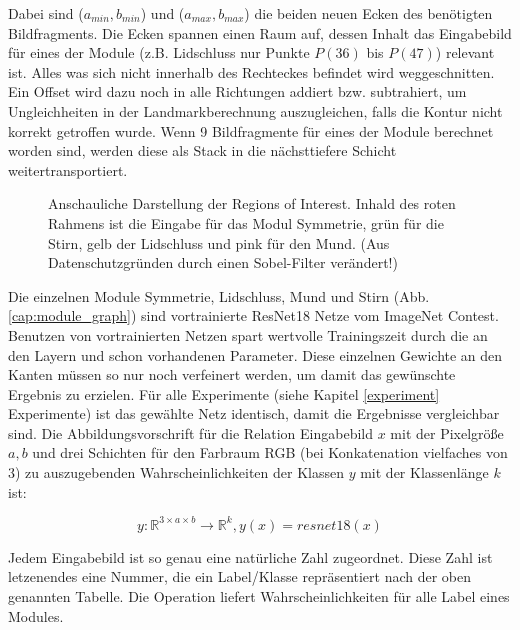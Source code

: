 Dabei sind ($a_{min}, b_{min}$) und ($a_{max}, b_{max}$) die beiden neuen Ecken des benötigten Bildfragments. Die Ecken spannen einen Raum auf, dessen Inhalt das Eingabebild für eines der Module (z.B. Lidschluss nur Punkte $P(36)$ bis $P(47)$) relevant ist. Alles was sich nicht innerhalb des Rechteckes befindet wird weggeschnitten. Ein Offset wird dazu noch in alle Richtungen addiert bzw. subtrahiert, um Ungleichheiten in der Landmarkberechnung auszugleichen, falls die Kontur nicht korrekt getroffen wurde. Wenn 9 Bildfragmente für eines der Module berechnet worden sind, werden diese als Stack in die nächsttiefere Schicht weitertransportiert.


\begin{figure}[!t]\centering
\makebox[0pt]{}
\vspace{-1cm}
\caption[Anschauliche Darstellung der Regions of Interest]{Anschauliche Darstellung der Regions of Interest\footnotemark. Inhald des roten Rahmens ist die Eingabe für das Modul Symmetrie, grün für die Stirn, gelb der Lidschluss und pink für den Mund. (Aus Datenschutzgründen durch einen Sobel-Filter verändert!)}\label{cap:r_of_interest}
\end{figure}\label{fig:r_of_interest}


Die einzelnen Module Symmetrie, Lidschluss, Mund und Stirn (Abb. \ref{cap:module_graph}) sind vortrainierte ResNet18 Netze vom ImageNet Contest. Benutzen von vortrainierten Netzen spart wertvolle Trainingszeit durch die an den Layern und schon vorhandenen Parameter. Diese einzelnen Gewichte an den Kanten müssen so nur noch verfeinert werden, um damit das gewünschte Ergebnis zu erzielen. Für alle Experimente (siehe Kapitel \ref{experiment} Experimente) ist das gewählte Netz identisch, damit die Ergebnisse vergleichbar sind. Die Abbildungsvorschrift für die Relation Eingabebild $x$ mit der Pixelgröße $a, b$ und drei Schichten für den Farbraum RGB (bei Konkatenation vielfaches von 3) zu auszugebenden Wahrscheinlichkeiten der Klassen $y$ mit der Klassenlänge $k$ ist:

\begin{equation}
y: \mathbb{R}^{3 \times a \times b} \to \mathbb{R}^{k}, y(x) = resnet18(x)
\end{equation}

Jedem Eingabebild ist so genau eine natürliche Zahl zugeordnet. Diese Zahl ist letzenendes eine Nummer, die ein Label/Klasse repräsentiert nach der oben genannten Tabelle. Die Operation liefert Wahrscheinlichkeiten für alle Label eines Modules.

